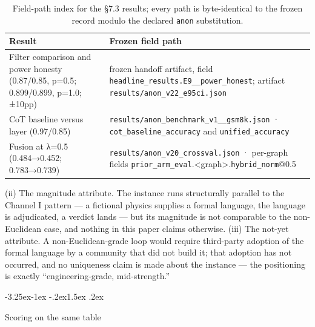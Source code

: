 \documentclass[11pt,a4paper]{article}
\makeatletter
\renewcommand\subsection{\@startsection{subsection}{2}{\z@}%
  {-3.25ex\@plus -1ex \@minus -.2ex}{1.5ex \@plus .2ex}%
  {\normalfont\large\bfseries\raggedright}}
\makeatother
\begin{document}
\begin{table}[htbp]
\centering
\small
\setlength{\tabcolsep}{4pt}
\renewcommand{\arraystretch}{1.15}
\begin{tabularx}{0.985\textwidth}{@{}>{\raggedright\arraybackslash}p{}>{\raggedright\arraybackslash}X@{}}
\toprule
\textbf{Result} & \textbf{Frozen field path} \\
\midrule
Filter comparison and power honesty (0.87/0.85, p=0.5; 0.899/0.899, p=1.0; ±10pp) & frozen handoff artifact, field \texttt{headline\_\allowbreak results.E9\_\allowbreak 5\_\allowbreak power\_\allowbreak honest}; artifact \texttt{results/\allowbreak anon\_\allowbreak v22\_\allowbreak e95ci.json} \\
CoT baseline versus layer (0.97/0.85) & \texttt{results/\allowbreak anon\_\allowbreak benchmark\_\allowbreak v1\_\allowbreak 4\_\allowbreak gsm8k.json} · \texttt{cot\_\allowbreak baseline\_\allowbreak accuracy} and \texttt{unified\_\allowbreak accuracy} \\
Fusion at λ=0.5 (0.484→0.452; 0.783→0.739) & \texttt{results/\allowbreak anon\_\allowbreak v20\_\allowbreak crossval.json} · per-graph fields \texttt{prior\_\allowbreak arm\_\allowbreak eval}.<graph>.\texttt{hybrid\_\allowbreak norm}@0.5 \\
\bottomrule
\end{tabularx}
\caption{Field-path index for the §7.3 results; every path is byte-identical to the frozen record modulo the declared \texttt{anon} substitution.}
\label{tab:fieldpathsS}
\end{table}

(ii) The magnitude attribute. The instance runs structurally parallel to the Channel I pattern — a fictional physics supplies a formal language, the language is adjudicated, a verdict lands — but its magnitude is not comparable to the non-Euclidean case, and nothing in this paper claims otherwise. (iii) The not-yet attribute. A non-Euclidean-grade loop would require third-party adoption of the formal language by a community that did not build it; that adoption has not occurred, and no uniqueness claim is made about the instance — the positioning is exactly ``engineering-grade, mid-strength.''

\subsection{Scoring on the same table}
\end{document}
